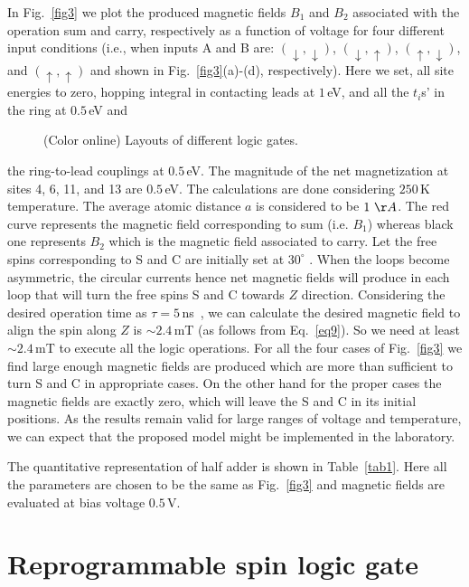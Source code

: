 \documentclass[prb,aps,twocolumn,amsmath,amssymb,floatfix,superscriptaddress]{revtex4}
\begin{document}
In Fig.~\ref{fig3} we plot the produced magnetic fields $B_1$ and $B_2$ associated
with the operation sum and carry, respectively as a function of voltage for
four different input conditions (i.e., when inputs A and B are: $(\downarrow, \downarrow)$,
$(\downarrow, \uparrow)$, $(\uparrow, \downarrow)$, and $(\uparrow, \uparrow)$ and shown in
Fig.~\ref{fig3}(a)-(d), respectively). Here we set, all site energies to zero, hopping
integral in contacting leads at $1\,$eV, and all the $t_i$s' in the ring at $0.5\,$eV and
\begin{figure}[ht]
{\centering{}\par}
\caption{(Color online) Layouts of different logic gates.}
\label{lg}
\end{figure}
the ring-to-lead couplings at $0.5\,$eV. The magnitude of the net magnetization at sites
4, 6, 11, and 13 are $0.5\,$eV. The calculations are done considering $250\,$K temperature. The
average atomic distance $a$ is considered to be $1~\AA$. The red curve represents the magnetic
field corresponding to sum (i.e. $B_1$) whereas black one represents $B_2$ which is the
magnetic field associated to carry. Let the free spins corresponding to S and C  are
initially set at $30^{\circ}$ . When the loops become asymmetric, the circular currents
hence net magnetic fields will produce in each loop that will turn the free spins S and
C towards $Z$ direction. Considering the desired operation time as $\tau=5\,$ns~\cite{cite22},
we can
calculate the desired magnetic field to align the spin along $Z$ is $\sim 2.4\,$mT (as
follows from Eq.~\ref{eq9}). So we need at least $\sim 2.4\,$mT to execute all the logic
operations. For all the four cases of Fig.~\ref{fig3} we find large enough magnetic fields
are produced which are more than sufficient to turn S and C in appropriate cases. On the
other hand for the proper cases the magnetic fields are exactly zero, which will leave
the S and C in its initial positions. As the results remain valid for large ranges of voltage
and temperature, we can expect that the proposed model might be implemented in the
laboratory. 

The quantitative representation of half adder is shown in Table~\ref{tab1}. Here all the
parameters are chosen to be the same as Fig.~\ref{fig3} and magnetic fields are evaluated at
bias voltage $0.5\,$V.

\section{Reprogrammable spin logic gate}
\end{document}
